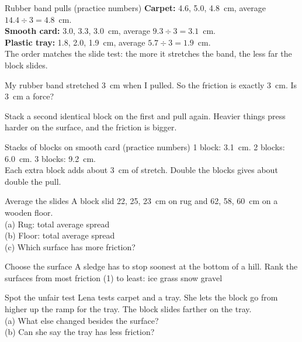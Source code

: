 \begin{worked}{Rubber band pulls (practice numbers)}
\textbf{Carpet:} 4.6, 5.0, 4.8~cm, average $14.4\div3=4.8$~cm.\\
\textbf{Smooth card:} 3.0, 3.3, 3.0~cm, average $9.3\div3=3.1$~cm.\\
\textbf{Plastic tray:} 1.8, 2.0, 1.9~cm, average $5.7\div3=1.9$~cm.\\
The order matches the slide test: the more it stretches the band, the less far the block slides.
\end{worked}

\begin{multix}[hmm]\multixbot[hmm]\tcblower
My rubber band stretched 3~cm when I pulled. So the friction is exactly 3~cm. Is 3~cm a force?
\end{multix}

Stack a second identical block on the first and pull again. Heavier things press harder on the surface, and the friction is bigger.

\begin{worked}{Stacks of blocks on smooth card (practice numbers)}
1 block: 3.1~cm. 2 blocks: 6.0~cm. 3 blocks: 9.2~cm.\\
Each extra block adds about 3~cm of stretch. Double the blocks gives about double the pull.
\end{worked}

\clearpage

\begin{puzzle}{Average the slides}
A block slid 22, 25, 23~cm on rug and 62, 58, 60~cm on a wooden floor.\\
(a) Rug: total \wline[1.4cm] average \wline[1.4cm] spread \wline[1.4cm]\\
(b) Floor: total \wline[1.4cm] average \wline[1.4cm] spread \wline[1.4cm]\\
(c) Which surface has more friction? \wline[2cm]
\end{puzzle}

\begin{puzzle}{Choose the surface}
A sledge has to stop soonest at the bottom of a hill. Rank the surfaces from most friction (1) to least: ice \wline[1cm] grass \wline[1cm] snow \wline[1cm] gravel \wline[1cm]
\end{puzzle}

\begin{puzzle}{Spot the unfair test}
Lena tests carpet and a tray. She lets the block go from higher up the ramp for the tray. The block slides farther on the tray.\\
(a) What else changed besides the surface? \wline[4cm]\\
(b) Can she say the tray has less friction? \wline[2cm]
\end{puzzle}

